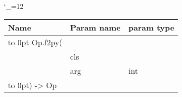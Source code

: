 \begingroup \catcode`\_=12 \tt
\begin{tabular}{lll}
\toprule
\textrm{Name}&\textrm{Param name}&\textrm{param type}\\
\midrule
\hbox to 0pt {Op.f2py(\hss}\\
& cls\\
& arg & int\\
\hbox to 0pt{) -> Op\hss}\\
\bottomrule
\end{tabular}
\endgroup
